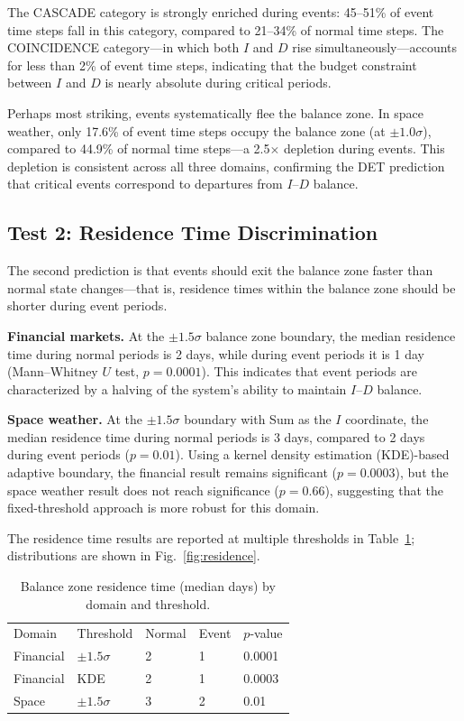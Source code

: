 \documentclass[aip,cha,reprint,amsmath,amssymb,final,floatfix]{revtex4-2}
\begin{document}
The CASCADE category is strongly enriched during events: 45--51\% of event time steps fall in this category, compared to 21--34\% of normal time steps. The COINCIDENCE category---in which both $I$ and $D$ rise simultaneously---accounts for less than 2\% of event time steps, indicating that the budget constraint between $I$ and $D$ is nearly absolute during critical periods.

Perhaps most striking, events systematically flee the balance zone. In space weather, only 17.6\% of event time steps occupy the balance zone (at $\pm 1.0\sigma$), compared to 44.9\% of normal time steps---a 2.5$\times$ depletion during events. This depletion is consistent across all three domains, confirming the DET prediction that critical events correspond to departures from $I$--$D$ balance.

\subsection{Test 2: Residence Time Discrimination}

The second prediction is that events should exit the balance zone faster than normal state changes---that is, residence times within the balance zone should be shorter during event periods.

\textbf{Financial markets.} At the $\pm 1.5\sigma$ balance zone boundary, the median residence time during normal periods is 2 days, while during event periods it is 1 day (Mann--Whitney $U$ test, $p = 0.0001$). This indicates that event periods are characterized by a halving of the system's ability to maintain $I$--$D$ balance.

\textbf{Space weather.} At the $\pm 1.5\sigma$ boundary with Sum as the $I$ coordinate, the median residence time during normal periods is 3 days, compared to 2 days during event periods ($p = 0.01$). Using a kernel density estimation (KDE)-based adaptive boundary, the financial result remains significant ($p = 0.0003$), but the space weather result does not reach significance ($p = 0.66$), suggesting that the fixed-threshold approach is more robust for this domain.

The residence time results are reported at multiple thresholds in Table~\ref{tab:residence}; distributions are shown in Fig.~\ref{fig:residence}.

\begin{table}[!htbp]
\caption[Balance zone residence time in median days by domain and threshold]{\label{tab:residence}Balance zone residence time (median days) by domain and threshold.}
\begin{ruledtabular}
\begin{tabular}{lllll}
Domain & Threshold & Normal & Event & $p$-value \\
Financial & $\pm 1.5\sigma$ & 2 & 1 & 0.0001 \\
Financial & KDE & 2 & 1 & 0.0003 \\
Space & $\pm 1.5\sigma$ & 3 & 2 & 0.01 \\
\end{tabular}
\end{ruledtabular}
\end{table}
\end{document}

